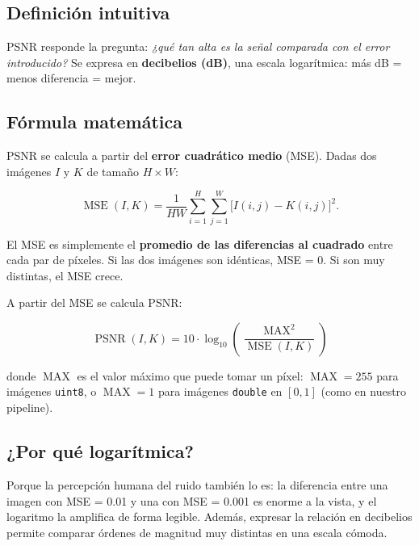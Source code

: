 \documentclass[11pt,a4paper]{article}
\begin{document}
\subsection{Definición intuitiva}

PSNR responde la pregunta: \emph{¿qué tan alta es la señal comparada con el
error introducido?} Se expresa en \textbf{decibelios (dB)}, una escala
logarítmica: más dB = menos diferencia = mejor.

\subsection{Fórmula matemática}

PSNR se calcula a partir del \textbf{error cuadrático medio} (MSE). Dadas dos
imágenes \(I\) y \(K\) de tamaño \(H \times W\):

\begin{equation}
    \operatorname{MSE}(I, K) = \frac{1}{HW} \sum_{i=1}^{H} \sum_{j=1}^{W}
    \bigl[ I(i,j) - K(i,j) \bigr]^2.
    \label{eq:mse}
\end{equation}

\vspace{0.3cm}
\noindent
El MSE es simplemente el \textbf{promedio de las diferencias al cuadrado} entre
cada par de píxeles. Si las dos imágenes son idénticas, MSE = 0. Si son muy
distintas, el MSE crece.

A partir del MSE se calcula PSNR:

\begin{equation}
    \boxed{\;
    \operatorname{PSNR}(I, K) = 10 \cdot \log_{10}\!\left(\frac{\operatorname{MAX}^2}{\operatorname{MSE}(I,K)}\right)
    \;}
    \label{eq:psnr}
\end{equation}

donde \(\operatorname{MAX}\) es el valor máximo que puede tomar un píxel:
\(\operatorname{MAX} = 255\) para imágenes \texttt{uint8}, o \(\operatorname{MAX} = 1\)
para imágenes \texttt{double} en \([0,1]\) (como en nuestro pipeline).

\subsection{¿Por qué logarítmica?}

Porque la percepción humana del ruido también lo es: la diferencia entre una
imagen con MSE = 0.01 y una con MSE = 0.001 es enorme a la vista, y el logaritmo
la amplifica de forma legible. Además, expresar la relación en decibelios
permite comparar órdenes de magnitud muy distintas en una escala cómoda.
\end{document}
